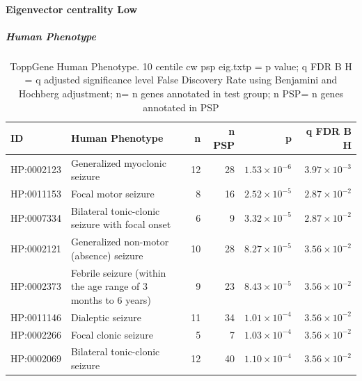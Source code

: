 \paragraph{Eigenvector centrality Low}
\subparagraph{Human Phenotype}
\begin{table}[ht]
\centering
\begin{tabular}{llrrrr}
  \hline
ID & Human Phenotype & n & n PSP & p & q FDR B H \\ 
  \hline
HP:0002123 & Generalized myoclonic seizure & 12 & 28 & $1.53 \times 10^{-6}$ & $3.97 \times 10^{-3}$ \\ 
  HP:0011153 & Focal motor seizure & 8 & 16 & $2.52 \times 10^{-5}$ & $2.87 \times 10^{-2}$ \\ 
  HP:0007334 & Bilateral tonic-clonic seizure with focal onset & 6 & 9 & $3.32 \times 10^{-5}$ & $2.87 \times 10^{-2}$ \\ 
  HP:0002121 & Generalized non-motor (absence) seizure & 10 & 28 & $8.27 \times 10^{-5}$ & $3.56 \times 10^{-2}$ \\ 
  HP:0002373 & Febrile seizure (within the age range of 3 months to 6 years) & 9 & 23 & $8.43 \times 10^{-5}$ & $3.56 \times 10^{-2}$ \\ 
  HP:0011146 & Dialeptic seizure & 11 & 34 & $1.01 \times 10^{-4}$ & $3.56 \times 10^{-2}$ \\ 
  HP:0002266 & Focal clonic seizure & 5 & 7 & $1.03 \times 10^{-4}$ & $3.56 \times 10^{-2}$ \\ 
  HP:0002069 & Bilateral tonic-clonic seizure & 12 & 40 & $1.10 \times 10^{-4}$ & $3.56 \times 10^{-2}$ \\ 
   \hline
\end{tabular}
\caption{ToppGene Human Phenotype. 10 centile cw psp eig.txtp = p value; q FDR B H = q adjusted significance level False Discovery Rate using Benjamini and Hochberg adjustment; n= n genes annotated in test group; n PSP= n genes annotated in PSP} 
\label{tab:ToppGENE Human Phenotype. 10 centile cw psp eig.txtp = p value; q FDR B H = q adjusted significance level False Discovery Rate using Benjamini and Hochberg adjustment; n= n genes annotated in test group; n PSP= n genes annotated in PSP}
\end{table}

